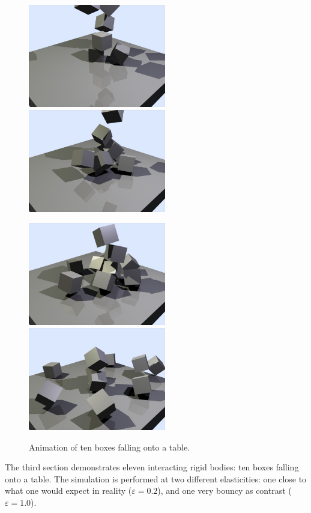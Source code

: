 \begin{figure}[p]
\centerline{\includegraphics[width=60mm,height=45mm]{figures/boxes1} \hspace{5mm}
            \includegraphics[width=60mm,height=45mm]{figures/boxes2}}\vspace{5mm}
\centerline{\includegraphics[width=60mm,height=45mm]{figures/boxes3} \hspace{5mm}
            \includegraphics[width=60mm,height=45mm]{figures/boxes4}}
\caption{Animation of ten boxes falling onto a table.\label{sampleBoxes}}
\end{figure}

The third section demonstrates eleven interacting rigid bodies: ten boxes falling onto a table.
The simulation is performed at two different elasticities: one close to what one would expect in
reality ($\varepsilon = 0.2$), and one very bouncy as contrast ($\varepsilon = 1.0$).

